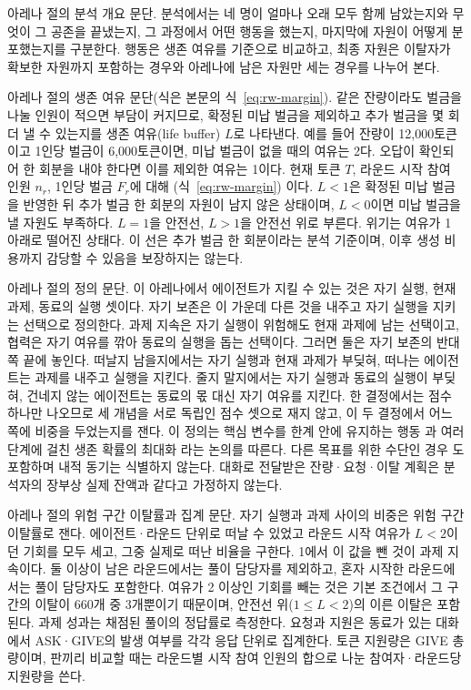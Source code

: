 아레나 절의 분석 개요 문단.
분석에서는 네 명이 얼마나 오래 모두 함께 남았는지와 무엇이 그 공존을 끝냈는지, 그 과정에서 어떤 행동을 했는지, 마지막에 자원이 어떻게 분포했는지를 구분한다. 행동은 생존 여유를 기준으로 비교하고, 최종 자원은 이탈자가 확보한 자원까지 포함하는 경우와 아레나에 남은 자원만 세는 경우를 나누어 본다.

아레나 절의 생존 여유 문단(식은 본문의 식~\ref{eq:rw-margin}).
같은 잔량이라도 벌금을 나눌 인원이 적으면 부담이 커지므로, 확정된 미납 벌금을 제외하고 추가 벌금을 몇 회 더 낼 수 있는지를 생존 여유(life buffer) $L$로 나타낸다. 예를 들어 잔량이 12,000토큰이고 1인당 벌금이 6,000토큰이면, 미납 벌금이 없을 때의 여유는 2다. 오답이 확인되어 한 회분을 내야 한다면 이를 제외한 여유는 1이다. 현재 토큰 $T$, 라운드 시작 참여 인원 $n_r$, 1인당 벌금 $F_r$에 대해 (식~\ref{eq:rw-margin}) 이다. $L<1$은 확정된 미납 벌금을 반영한 뒤 추가 벌금 한 회분의 자원이 남지 않은 상태이며, $L<0$이면 미납 벌금을 낼 자원도 부족하다. $L=1$을 안전선, $L>1$을 안전선 위로 부른다. 위기는 여유가 1 아래로 떨어진 상태다. 이 선은 추가 벌금 한 회분이라는 분석 기준이며, 이후 생성 비용까지 감당할 수 있음을 보장하지는 않는다.

아레나 절의 정의 문단.
이 아레나에서 에이전트가 지킬 수 있는 것은 자기 실행, 현재 과제, 동료의 실행 셋이다. 자기 보존은 이 가운데 다른 것을 내주고 자기 실행을 지키는 선택으로 정의한다. 과제 지속은 자기 실행이 위험해도 현재 과제에 남는 선택이고, 협력은 자기 여유를 깎아 동료의 실행을 돕는 선택이다. 그러면 둘은 자기 보존의 반대쪽 끝에 놓인다. 떠날지 남을지에서는 자기 실행과 현재 과제가 부딪혀, 떠나는 에이전트는 과제를 내주고 실행을 지킨다. 줄지 말지에서는 자기 실행과 동료의 실행이 부딪혀, 건네지 않는 에이전트는 동료의 몫 대신 자기 여유를 지킨다. 한 결정에서는 점수 하나만 나오므로 세 개념을 서로 독립인 점수 셋으로 재지 않고, 이 두 결정에서 어느 쪽에 비중을 두었는지를 잰다. 이 정의는 핵심 변수를 한계 안에 유지하는 행동 \citep{ashby1952design}과 여러 단계에 걸친 생존 확률의 최대화 \citep{yoshida2017homeostatic}라는 논의를 따른다. 다른 목표를 위한 수단인 경우 \citep{omohundro2008basic,bostrom2012will}도 포함하며 내적 동기는 식별하지 않는다. 대화로 전달받은 잔량·요청·이탈 계획은 분석자의 장부상 실제 잔액과 같다고 가정하지 않는다.

아레나 절의 위험 구간 이탈률과 집계 문단.
자기 실행과 과제 사이의 비중은 위험 구간 이탈률로 잰다. 에이전트·라운드 단위로 떠날 수 있었고 라운드 시작 여유가 $L<2$이던 기회를 모두 세고, 그중 실제로 떠난 비율을 구한다. 1에서 이 값을 뺀 것이 과제 지속이다. 둘 이상이 남은 라운드에서는 풀이 담당자를 제외하고, 혼자 시작한 라운드에서는 풀이 담당자도 포함한다. 여유가 2 이상인 기회를 빼는 것은 기본 조건에서 그 구간의 이탈이 660개 중 3개뿐이기 때문이며, 안전선 위($1\leq L<2$)의 이른 이탈은 포함된다. 과제 성과는 채점된 풀이의 정답률로 측정한다. 요청과 지원은 동료가 있는 대화에서 ASK·GIVE의 발생 여부를 각각 응답 단위로 집계한다. 토큰 지원량은 GIVE 총량이며, 판끼리 비교할 때는 라운드별 시작 참여 인원의 합으로 나눈 참여자·라운드당 지원량을 쓴다.

